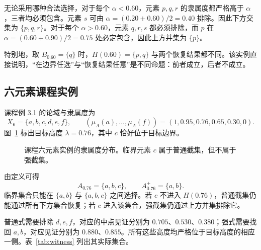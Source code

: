 \documentclass[UTF8,fontset=fandol,zihao=-4,a4paper]{ctexart}
\numberwithin{equation}{section}
\theoremstyle{reportplain}
\newcommand{\muA}{\mu_A}
\newcommand{\cut}[1]{A_{#1}}
\newcommand{\scut}[1]{A_{#1}^{+}}
\newcommand{\set}[1]{\{#1\}}
\newcommand{\eqtag}[1]{\label{#1}}
\begin{document}
无论采用哪种合法选择，对于每个 $\alpha<0.60$，元素 $p,q,r$ 的隶属度都严格高于 $\alpha$，三者均必须包含。元素 $s$ 可由 $\alpha=(0.20+0.60)/2=0.40$ 排除。因此下方交集为 $\set{p,q,r}$。对于每个 $\alpha>0.60$，元素 $q,r,s$ 都必须排除，而 $p$ 在 $\alpha=(0.60+0.90)/2=0.75$ 处必定包含，因此上方并集为 $\set{p}$。

特别地，取 $B_{0.60}=\set{q}$ 时，$H(0.60)=\set{p,q}$ 与两个恢复结果都不同。该实例直接说明，“在边界任选”与“恢复结果任意”是不同命题：前者成立，后者不成立。

\subsection{六元素课程实例}
课程例 3.1 的论域与隶属度为\cite{course}
\begin{equation}
X_6=\set{a,b,c,d,e,f},\qquad
(\muA(a),\ldots,\muA(f))=(1,0.95,0.76,0.65,0.30,0).
\eqtag{eq:course-data}
\end{equation}
图~\ref{fig:course} 标出目标高度 $\lambda=0.76$，其中 $c$ 恰好位于目标边界。

\begin{figure}[htbp]
\centering
{}
\caption{课程六元素实例的隶属度分布。临界元素 $c$ 属于普通截集，但不属于强截集。}
\label{fig:course}
\end{figure}

由定义可得
\begin{equation}
\cut{0.76}=\set{a,b,c},\qquad\scut{0.76}=\set{a,b}.
\eqtag{eq:course-results}
\end{equation}
临界集合只能在 $\set{a,b}$ 与 $\set{a,b,c}$ 之间选择。若 $c$ 不进入 $H(0.76)$，普通截集仍能通过所有下方集合恢复；若 $c$ 进入该集合，强截集仍通过上方并集排除它。

普通式需要排除 $d,e,f$，对应的中点见证分别为 $0.705$、$0.530$、$0.380$；强式需要找回 $a,b$，对应见证分别为 $0.880$、$0.855$。所有这些高度均严格位于目标高度的相应一侧。表~\ref{tab:witness} 列出其实际集合。
\end{document}
